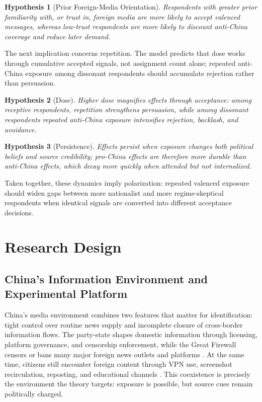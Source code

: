 \documentclass[12pt,american]{article}
\newtheorem{hypothesis}{Hypothesis}
\begin{document}
\begin{singlespace}
\begin{hypothesis}[Prior Foreign-Media Orientation]
Respondents with greater prior familiarity with, or trust in, foreign media are more likely to accept valenced messages, whereas low-trust respondents are more likely to discount anti-China coverage and reduce later demand.
\end{hypothesis}
\end{singlespace}

The next implication concerns repetition. The model predicts that dose works through cumulative accepted signals, not assignment count alone; repeated anti-China exposure among dissonant respondents should accumulate rejection rather than persuasion.
\begin{singlespace}
\begin{hypothesis}[Dose]
Higher dose magnifies effects through acceptance: among receptive respondents, repetition strengthens persuasion, while among dissonant respondents repeated anti-China exposure intensifies rejection, backlash, and avoidance.
\end{hypothesis}
\end{singlespace}

\begin{singlespace}
\begin{hypothesis}[Persistence]
Effects persist when exposure changes both political beliefs and source credibility; pro-China effects are therefore more durable than anti-China effects, which decay more quickly when attended but not internalized.
\end{hypothesis}
\end{singlespace}

Taken together, these dynamics imply polarization: repeated valenced exposure should widen gaps between more nationalist and more regime-skeptical respondents when identical signals are converted into different acceptance decisions.

	\section*{Research Design}
	
	\subsection*{China's Information Environment and Experimental Platform}
	
China's media environment combines two features that matter for identification: tight control over routine news supply and incomplete closure of cross-border information flows. The party-state shapes domestic information through licensing, platform governance, and censorship enforcement, while the Great Firewall censors or bans many major foreign news outlets and platforms \citep{FreedomHouse2024,kingpanroberts2013,roberts2018,stockmann2013}. At the same time, citizens still encounter foreign content through VPN use, screenshot recirculation, reposting, and educational channels \citep{ChangEtAl2022,hobbsroberts2018,weiss2014powerful}. This coexistence is precisely the environment the theory targets: exposure is possible, but source cues remain politically charged.
\end{document}
